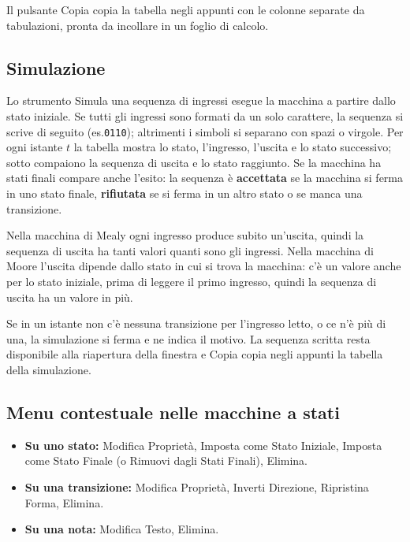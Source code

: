 \documentclass[a4paper,11pt]{article}
\newcommand\mediumweight{\fontseries{mb}\selectfont}
\newcommand\uielement[1]{{\mediumweight #1}}
\begin{document}
Il pulsante \uielement{Copia} copia la tabella negli appunti con le colonne separate da
tabulazioni, pronta da incollare in un foglio di calcolo.

\subsection{Simulazione}

Lo strumento \uielement{Simula una sequenza di ingressi} esegue la macchina a partire dallo stato
iniziale. Se tutti gli ingressi sono formati da un solo carattere, la sequenza si scrive di seguito
(es.\@ \texttt{0110}); altrimenti i simboli si separano con spazi o virgole. Per ogni istante $t$
la tabella mostra lo stato, l'ingresso, l'uscita e lo stato successivo; sotto compaiono la sequenza
di uscita e lo stato raggiunto. Se la macchina ha stati finali compare anche l'esito: la sequenza è
\textbf{accettata} se la macchina si ferma in uno stato finale, \textbf{rifiutata} se si ferma in
un altro stato o se manca una transizione.

\begin{tcolorbox}[notebox, title={Mealy e Moore a confronto}]
  Nella macchina di Mealy ogni ingresso produce subito un'uscita, quindi la sequenza di uscita ha
  tanti valori quanti sono gli ingressi. Nella macchina di Moore l'uscita dipende dallo stato in cui
  si trova la macchina: c'è un valore anche per lo stato iniziale, prima di leggere il primo
  ingresso, quindi la sequenza di uscita ha un valore in più.
\end{tcolorbox}

Se in un istante non c'è nessuna transizione per l'ingresso letto, o ce n'è più di una, la
simulazione si ferma e ne indica il motivo. La sequenza scritta resta disponibile alla riapertura
della finestra e \uielement{Copia} copia negli appunti la tabella della simulazione.

\subsection{Menu contestuale nelle macchine a stati}

\begin{itemize}
  \item \textbf{Su uno stato:} Modifica Proprietà, Imposta come Stato Iniziale, Imposta come Stato
        Finale (o Rimuovi dagli Stati Finali), Elimina.
  \item \textbf{Su una transizione:} Modifica Proprietà, Inverti Direzione, Ripristina Forma,
        Elimina.
  \item \textbf{Su una nota:} Modifica Testo, Elimina.
\end{itemize}
\end{document}
